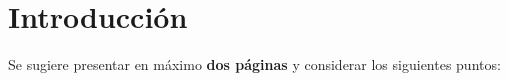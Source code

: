 \chapter*{Introducción}

Se sugiere presentar en máximo \textbf{dos páginas} y considerar los siguientes puntos:
